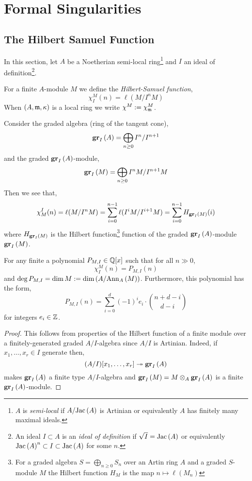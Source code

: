 \documentclass[12pt]{article}
\begin{document}
\section{Formal Singularities}

\subsection{The Hilbert Samuel Function}

In this section, let $A$ be a Noetherian semi-local ring\footnote{$A$ is \textit{semi-local} if $A / \mathrm{Jac}\left( A \right)$ is Artinian or equivalently $A$ has finitely many maximal ideals.} and $I$ an ideal of definition\footnote{An ideal $I \subset A$ is an \textit{ideal of definition} if $\sqrt{I} = \mathrm{Jac}\left( A \right)$ or equivalently $\mathrm{Jac}\left( A \right)^n \subset I \subset \mathrm{Jac}\left( A \right)$ for some $n$.}.

\begin{defn}
For a finite $A$-module $M$ we define the \textit{Hilbert-Samuel function},
\[ \chi^{M}_{I}(n) = \ell(M / I^n M) \]
When $(A, \mathfrak{m}, \kappa)$ is a local ring we write $\chi^M := \chi^{M}_{\mathfrak{m}}$.
\end{defn}

\begin{rmk}
Consider the graded algebra (ring of the tangent cone),
\[ \mathbf{gr}_{I}\left(A\right) = \bigoplus_{n \ge 0} I^n / I^{n+1} \]
and the graded $\mathbf{gr}_{I}\left(A\right)$-module,
\[ \mathbf{gr}_{I}\left(M\right) = \bigoplus_{n \ge 0} I^n M / I^{n+1} M \] 
Then we see that,
\[ \chi^I_M(n) = \ell(M / I^n M) = \sum_{i = 0}^{n-1} \ell(I^i M / I^{i+1} M) = \sum_{i = 0}^{n-1} H_{\mathbf{gr}_{I}\left(M\right)}(i) \]
where $H_{\mathbf{gr}_{I}\left(M\right)}$ is the Hilbert function\footnote{For a graded algebra $S = \bigoplus_{n \ge 0} S_n$ over an Artin ring $A$ and a graded $S$-module $M$ the Hilbert function $H_M$ is the map $n \mapsto \ell(M_n)$} function of the graded $\mathbf{gr}_{I}\left(A\right)$-module $\mathbf{gr}_{I}\left(M\right)$.
\end{rmk}

\begin{prop}
For any finite a polynomial $P_{M,I} \in \mathbb{Q}[x]$ such that for all $n \gg 0$,
\[ \chi^{M}_{I}(n) = P_{M,I}(n) \]
and $\deg{P_{M,I}} = \dim{M} := \dim{(A / \mathrm{Ann}_{A}\left(M\right))}$. Furthermore, this polynomial has the form,
\[ P_{M,I}(n) = \sum_{i = 0}^d (-1)^i e_i \cdot { n + d - i \choose d - i} \]
for integers $e_i \in \mathbb{Z}$.
\end{prop}

\begin{proof}
This follows from properties of the Hilbert function of a finite module over a finitely-generated graded $A/I$-algebra since $A/I$ is Artinian. Indeed, if $x_1, \dots, x_r \in I$ generate then,
\[ (A/I)[x_1, \dots, x_r] \twoheadrightarrow \mathbf{gr}_{I}\left(A\right) \]
makes $\mathbf{gr}_{I}\left(A\right)$ a finite type $A/I$-algebra and $\mathbf{gr}_{I}\left(M\right) = M \otimes_A \mathbf{gr}_{I}\left(A\right)$ is a finite $\mathbf{gr}_{I}\left(A\right)$-module.
\end{proof}
\end{document}
